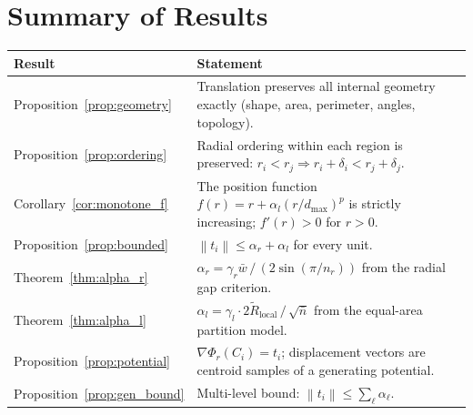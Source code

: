 \documentclass[12pt, a4paper]{article}
\numberwithin{equation}{section}
\theoremstyle{definition}
\theoremstyle{plain}
\theoremstyle{remark}
\newcommand{\norm}[1]{\left\|#1\right\|}
\begin{document}
\section{Summary of Results}
\label{sec:summary}

\begin{center}
\renewcommand{\arraystretch}{1.6}
\begin{tabular}{lp{10cm}}
\toprule
\textbf{Result} & \textbf{Statement} \\
\midrule
Proposition~\ref{prop:geometry} & Translation preserves all internal geometry exactly (shape, area, perimeter, angles, topology). \\
Proposition~\ref{prop:ordering} & Radial ordering within each region is preserved: $r_i < r_j \Rightarrow r_i + \delta_i < r_j + \delta_j$. \\
Corollary~\ref{cor:monotone_f} & The position function $f(r) = r + \alpha_l(r/d_{\max})^p$ is strictly increasing; $f'(r) > 0$ for $r > 0$. \\
Proposition~\ref{prop:bounded} & $\norm{t_i} \leq \alpha_r + \alpha_l$ for every unit. \\
Theorem~\ref{thm:alpha_r} & $\alpha_r = \gamma_r\bar{w}\,/\,(2\sin(\pi/n_r))$ from the radial gap criterion. \\
Theorem~\ref{thm:alpha_l} & $\alpha_l = \gamma_l \cdot 2\widetilde{R}_{\text{local}}\,/\,\sqrt{\bar{n}}$ from the equal-area partition model. \\
Proposition~\ref{prop:potential} & $\nabla\Phi_r(C_i) = t_i$; displacement vectors are centroid samples of a generating potential. \\
Proposition~\ref{prop:gen_bound} & Multi-level bound: $\norm{t_i} \leq \sum_\ell \alpha_\ell$. \\
\bottomrule
\end{tabular}
\end{center}
\end{document}
